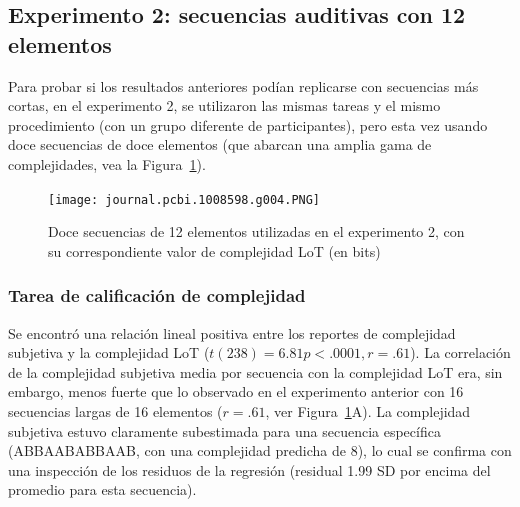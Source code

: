 \subsection{Experimento 2: secuencias auditivas con 12 elementos}
\label{ploscomp-results-exp2}


Para probar si los resultados anteriores podían replicarse con secuencias más cortas, en el experimento 2, se utilizaron las mismas tareas y el mismo procedimiento (con un grupo diferente de participantes), pero esta vez usando doce secuencias de doce elementos (que abarcan una amplia gama de complejidades, vea la Figura~\ref{PlosBIO-F4}).

\begin{figure}[t!]
   \texttt{[image: journal.pcbi.1008598.g004.PNG]}
   \centering
   \caption{Doce secuencias de 12 elementos utilizadas en el experimento 2, con su correspondiente valor de complejidad LoT (en bits)}
   \label{PlosBIO-F4}
\end{figure}

\subsubsection*{Tarea de calificación de complejidad}


Se encontró una relación lineal positiva entre los reportes de complejidad subjetiva y la complejidad LoT ($t(238) = 6.81 p < .0001, r = .61$). La correlación de la complejidad subjetiva media por secuencia con la complejidad LoT era, sin embargo, menos fuerte que lo observado en el experimento anterior con 16 secuencias largas de 16 elementos ($r = .61$, ver Figura~\ref{PlosBIO-F4}A). La complejidad subjetiva estuvo claramente subestimada para una secuencia específica (ABBAABABBAAB, con una complejidad predicha de 8), lo cual se confirma con una inspección de los residuos de la regresión (residual 1.99 SD por encima del promedio para esta secuencia).


